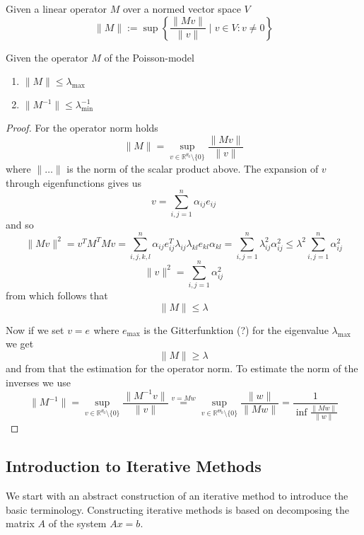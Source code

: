 \begin{definition}
   Given a linear operator \(M\) over a normed vector space \(V\)
   \[\|M\| := \sup\left\{\frac{\|Mv\|}{\|v\|} \mid v \in V: v \neq 0\right\}\]
\end{definition}

\begin{proposition}
   Given the operator \(M\) of the Poisson-model
   \begin{enumerate}[label=\roman*, align=Center]
      \item \(\|M\| \leq \lambda_{\max}\)
      \item \(\|M^{-1}\| \leq \lambda_{\min}^{-1}\)
   \end{enumerate}
\end{proposition}
\begin{proof}
   For the operator norm holds
   \[\|M\| = \sup_{v \in \mathbb{R}^{\theta_0} \setminus \{0\}} \frac{\|Mv\|}{\|v\|}\]
   where \(\|\ldots\|\) is the norm of the scalar product above.
   The expansion of \(v\) through eigenfunctions gives us
   \[v = \sum_{i,j = 1}^n \alpha_{ij}e_{ij}\]
   and so
   \[\|Mv\|^2 = v^T M^T M v = \sum_{i,j,k,l}^n \alpha_{ij}e_{ij}^T \lambda_{ij} \lambda_{kl} e_{kl} \alpha_{kl} = \sum_{i,j = 1}^n \lambda_{ij}^2 \alpha_{ij}^2 \leq \lambda_{}^2 \sum_{i,j = 1}^n \alpha_{ij}^2\]
   \[\|v\|^2 = \sum_{i,j = 1}^n \alpha_{ij}^2\]
   from which follows that
   \[\|M\| \leq \lambda_{}\]

   Now if we set \(v = e_{}\) where \(e_{\max}\) is the Gitterfunktion (?) for the eigenvalue \(\lambda_{\max}\) we get
   \[\|M\| \geq \lambda_{}\]
   and from that the estimation for the operator norm.
   To estimate the norm of the inverses we use
   \[\|M^{-1}\| = \sup_{v \in \mathbb{R}^{\theta_0} \setminus \{0\}} \frac{\|M^{-1}v\|}{\|v\|} \overset{v = Mw}{=} \sup_{v \in \mathbb{R}^{\Theta_0} \setminus \{0\}} \frac{\|w\|}{\|Mw\|} = \frac{1}{\inf \frac{\|Mw\|}{\|w\|}}\]
\end{proof}

\subsection{Introduction to Iterative Methods}
We start with an abstract construction of an iterative method to introduce the basic terminology.
Constructing iterative methods is based on decomposing the matrix \(A\) of the system \(Ax = b\).

